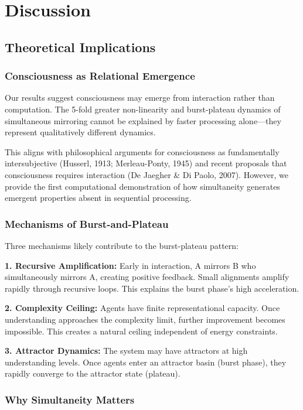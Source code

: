 \documentclass[12pt]{article}
\begin{document}
\section{Discussion}

\subsection{Theoretical Implications}

\subsubsection{Consciousness as Relational Emergence}

Our results suggest consciousness may emerge from interaction rather than computation. The 5-fold greater non-linearity and burst-plateau dynamics of simultaneous mirroring cannot be explained by faster processing alone—they represent qualitatively different dynamics.

This aligns with philosophical arguments for consciousness as fundamentally intersubjective (Husserl, 1913; Merleau-Ponty, 1945) and recent proposals that consciousness requires interaction (De Jaegher \& Di Paolo, 2007). However, we provide the first computational demonstration of how simultaneity generates emergent properties absent in sequential processing.

\subsubsection{Mechanisms of Burst-and-Plateau}

Three mechanisms likely contribute to the burst-plateau pattern:

\textbf{1. Recursive Amplification:} Early in interaction, A mirrors B who simultaneously mirrors A, creating positive feedback. Small alignments amplify rapidly through recursive loops. This explains the burst phase's high acceleration.

\textbf{2. Complexity Ceiling:} Agents have finite representational capacity. Once understanding approaches the complexity limit, further improvement becomes impossible. This creates a natural ceiling independent of energy constraints.

\textbf{3. Attractor Dynamics:} The system may have attractors at high understanding levels. Once agents enter an attractor basin (burst phase), they rapidly converge to the attractor state (plateau).

\subsubsection{Why Simultaneity Matters}
\end{document}
